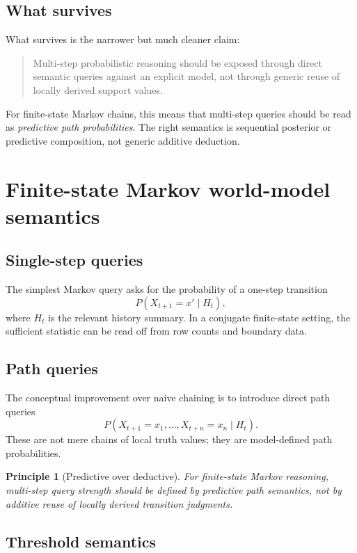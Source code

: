 \documentclass[11pt]{article}
\newtheorem{principle}{Principle}
\begin{document}
\subsection{What survives}

What survives is the narrower but much cleaner claim:
\begin{quote}
Multi-step probabilistic reasoning should be exposed through direct semantic
queries against an explicit model, not through generic reuse of locally derived
support values.
\end{quote}

For finite-state Markov chains, this means that multi-step queries should be
read as \emph{predictive path probabilities}.  The right semantics is
sequential posterior or predictive composition, not generic additive deduction.

\section{Finite-state Markov world-model semantics}

\subsection{Single-step queries}

The simplest Markov query asks for the probability of a one-step transition
\[
P(X_{t+1}=x' \mid H_t),
\]
where $H_t$ is the relevant history summary.  In a conjugate finite-state
setting, the sufficient statistic can be read off from row counts and boundary
data.

\subsection{Path queries}

The conceptual improvement over naive chaining is to introduce direct path
queries
\[
P(X_{t+1}=x_1,\ldots,X_{t+n}=x_n \mid H_t).
\]
These are not mere chains of local truth values; they are model-defined path
probabilities.

\begin{principle}[Predictive over deductive]
For finite-state Markov reasoning, multi-step query strength should be defined
by predictive path semantics, not by additive reuse of locally derived
transition judgments.
\end{principle}

\subsection{Threshold semantics}
\end{document}
